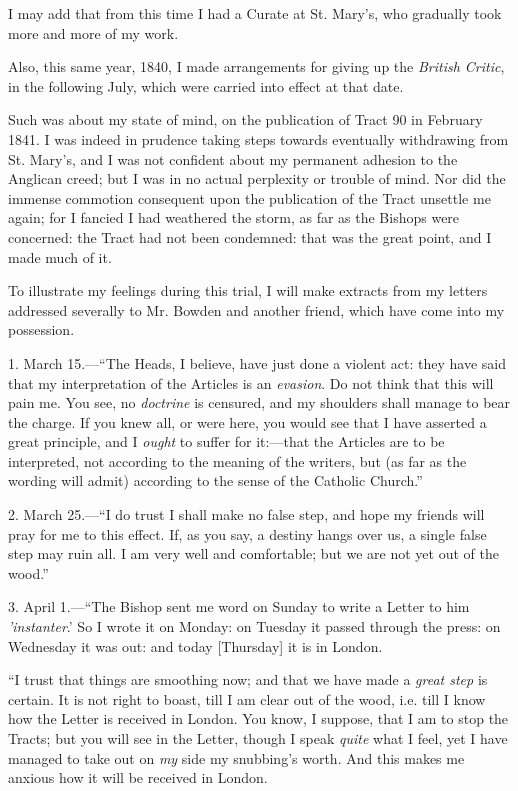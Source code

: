 I may add that from this time I had a Curate at St. Mary's, who
gradually took more and more of my work.

Also, this same year, 1840, I made arrangements for giving up the \emph{British Critic}, in the following July, which were carried into effect at
that date.

Such was about my state of mind, on the publication of Tract 90 in
February 1841. I was indeed in prudence taking steps towards
eventually withdrawing from St. Mary's, and I was not confident about my
permanent adhesion to the Anglican creed; but I was in no actual
perplexity or trouble of mind. Nor did the immense commotion
consequent upon the publication of the Tract unsettle me
again; for I fancied I had weathered the storm, as far as
the Bishops were concerned: the Tract had not been condemned:
that was the great point, and I made much of it.

To illustrate my feelings during this trial, I will make extracts
from my letters addressed severally to Mr. Bowden and another friend, which have come into my
possession.

1. March 15.—``The Heads, I believe, have just done a
violent act: they have said that my interpretation of the Articles is an
\emph{evasion}. Do not think that this will pain me. You see, no \emph{doctrine}
is censured, and my shoulders shall manage to bear the charge. If you
knew all, or were here, you would see that I have asserted a great
principle, and I \emph{ought} to suffer for it:—that the Articles are
to be interpreted, not according to the meaning of the writers, but (as
far as the wording will admit) according to the sense of the Catholic
Church.''

2. March 25.—``I do trust I shall make no
false step, and hope my friends will pray for me to this effect. If, as
you say, a destiny hangs over us, a single false step may ruin all. I am
very well and comfortable; but we are not yet out of the wood.''

3. April 1.—``The Bishop sent me word on
Sunday to write a Letter to him \emph{'instanter}.' So I wrote
it on Monday: on Tuesday it passed through the press: on Wednesday it
was out: and today [Thursday] it is in London.

``I trust that things are smoothing now; and that we have made a \emph{great
step} is certain. It is not right to boast, till I am clear out of
the wood, i.e. till I know how the Letter is received in
London. You know, I suppose, that I am to stop the Tracts; but you will
see in the Letter, though I speak \emph{quite} what I feel, yet I have
managed to take out on \emph{my} side my snubbing's worth. And this
makes me anxious how it will be received in London.

